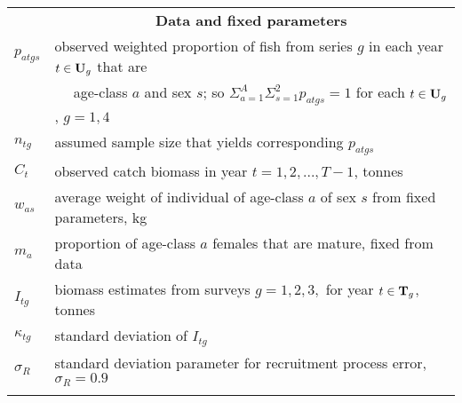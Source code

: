 \begin{tabular}{ll}
\\[-.5ex]
& \multicolumn{1}{c}{{\bf Data and fixed parameters}} \\
$p_{atgs}$ & observed weighted proportion of fish from series $g$ in each year $t \in {\bf U}_g$ that are\\
 & ~~  age-class $a$ and sex $s$; so $\Sigma_{a=1}^{A} \Sigma_{s=1}^2 p_{atgs} = 1$ for each $t  \in {\bf U}_g$, $g=1,4$\\
$n_{tg}$ & assumed sample size that yields corresponding $p_{atgs}$\\
$C_t$ & observed catch biomass in year $t = 1, 2, ..., T-1$, tonnes\\
$w_{as}$ & average weight of individual of age-class $a$ of sex $s$ from fixed parameters, kg\\ 
$m_a$ & proportion of age-class $a$ females that are mature, fixed from data\\
$I_{tg}$ & biomass estimates from surveys $g = 1,2,3,$ for year $t \in {\bf T}_g$, tonnes\\
$\kappa_{tg}$ & standard deviation of $I_{tg}$\\
$\sigma_R$ & standard deviation parameter for recruitment process error, $\sigma_R = 0.9$ \\
%
%
 & \\
\hline
\end{tabular} \newp %




